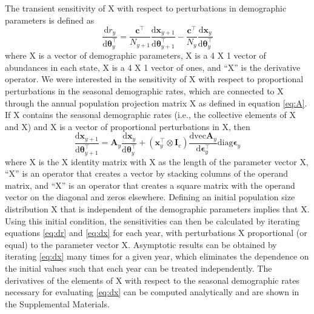 \documentclass[11pt]{article}
\begin{document}
The transient sensitivity of X with respect to perturbations in demographic parameters
is defined as
%
\begin{equation} \label{eq:dr}
\frac{\text{d}r_y}{\text{d}\boldsymbol\theta_y^\top} =
    \frac{\mathbf{c}^\top}{N_{y+1}} \frac{\text{d}\mathbf{x}_{y+1}}
            {\text{d}\boldsymbol\theta_{y+1}^\top}-
        \frac{\mathbf{c}^\top}{N_{y}} \frac{\text{d}\mathbf{x}_y}
            {\text{d}\boldsymbol\theta_y^\top}
\end{equation}
%
where X is a vector of demographic parameters,
X is a 4 X 1 vector of abundances in each state,
X is a 4 X 1 vector of ones,
and ``X'' is the derivative operator.
We were interested in the sensitivity of X with respect to proportional
perturbations in the seasonal demographic rates,
which are connected to X through the annual population projection matrix
X as defined in equation \ref{eq:A}.
If X contains the seasonal demographic rates
(i.e., the collective elements of X and X)
and X is a vector of proportional perturbations in
X,
then
%
\begin{equation} \label{eq:dx}
\frac{\text{d}\mathbf{x}_{y+1}}{\text{d}\boldsymbol\theta_{y+1}^\top} =
    \mathbf{A}_y \frac{\text{d}\mathbf{x}_{y}}{\text{d}\boldsymbol\theta_y^\top}+
        \left(\mathbf{x}_{y}^\top \otimes \mathbf{I}_c \right)
            \frac{\text{dvec}\mathbf{A}_y}{\text{d}\boldsymbol\epsilon_y^\top}
                \text{diag}\boldsymbol\epsilon_y
\end{equation}
%
where X is the X identity matrix with X as the length
of the parameter vector X,
``X'' is an operator that creates a vector by stacking columns of the operand matrix,
and ``X'' is an operator that creates a square matrix with the operand vector on
the diagonal and zeros elsewhere.
Defining an initial population size distribution X
that is independent of the demographic parameters implies that
X.
Using this initial condition,
the sensitivities can then be calculated by iterating equations \ref{eq:dr} and \ref{eq:dx}
for each year, with perturbations X proportional (or equal)
to the parameter vector X.
Asymptotic results can be obtained by iterating \ref{eq:dx} many times for a given year,
which eliminates the dependence on the initial values such that each year can be treated
independently.
The derivatives of the elements of X with respect to the seasonal
demographic rates necessary for evaluating \ref{eq:dx} can be computed analytically
and are shown in the Supplemental Materials.
\end{document}
